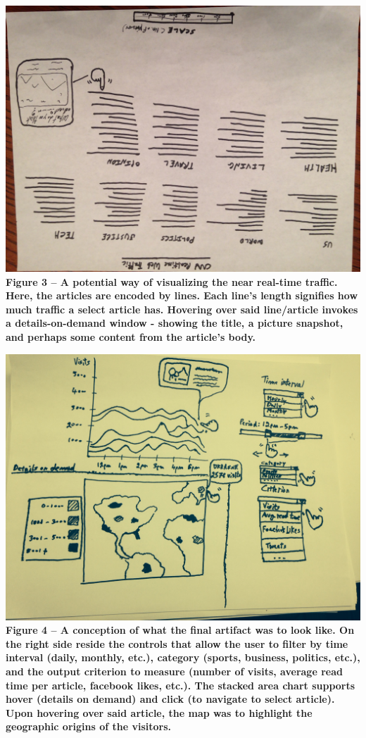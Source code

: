 \documentclass[12pt]{article}
\begin{document}
\noindent\includegraphics[scale=0.2]{img/cnn_categories}
\noindent\textbf{Figure 3 -- A potential way of visualizing the near real-time traffic. Here, the articles are encoded by lines. Each line's length signifies how much traffic a select article has. Hovering over said line/article invokes a details-on-demand window - showing the title, a picture snapshot, and perhaps some content from the article's body.}

\noindent\includegraphics[scale=0.2]{img/overall_viz}
\noindent\textbf{Figure 4 -- A conception of what the final artifact was to look like. On the right side reside the controls that allow the user to filter by time interval (daily, monthly, etc.), category (sports, business, politics, etc.), and the output criterion to measure (number of visits, average read time per article, facebook likes, etc.). The stacked area chart supports hover (details on demand) and click (to navigate to select article). Upon hovering over said article, the map was to highlight the geographic origins of the visitors.}
\end{document}
